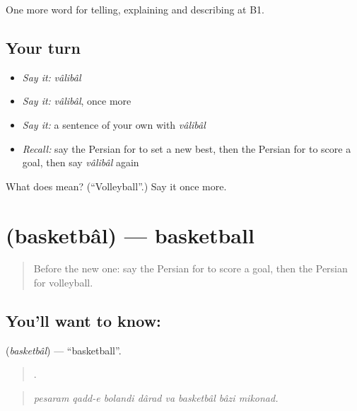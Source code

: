 \begin{grammarlens}[title={What you've built}]
One more word for telling, explaining and describing at B1.
\end{grammarlens}

\subsection*{Your turn}
\begin{itemize}
\raggedright
  \item \emph{Say it:} \emph{vâlibâl}
  \item \emph{Say it:} \emph{vâlibâl}, once more
  \item \emph{Say it:} a sentence of your own with \emph{vâlibâl}
  \item \emph{Recall:} say the Persian for to set a new best, then the Persian for to score a goal, then say \emph{vâlibâl} again
\end{itemize}

\begin{tcolorbox}[breakable,colback=teal!4,colframe=teal!35!black,title={Before you move on}]
What does  mean? (\textquotedblleft{}Volleyball\textquotedblright{}.) Say it once more.
\end{tcolorbox}
\section[\texorpdfstring{\fa{بسکتبال} (basketbâl)}{بسکتبال (basketbâl)}]{ (basketbâl) — basketball}

\label{lesson:FA-C514-basketbal}



\begin{quote}
Before the new one: say the Persian for to score a goal, then the Persian for volleyball.
\end{quote}

\subsection*{You'll want to know: }
\textbf{} (\emph{basketbâl}) — \textquotedblleft{}basketball\textquotedblright{}.

\begin{quote}
       .
\end{quote}

\begin{quote}
\emph{pesaram qadd-e bolandi dârad va basketbâl bâzi mikonad.}
\end{quote}

